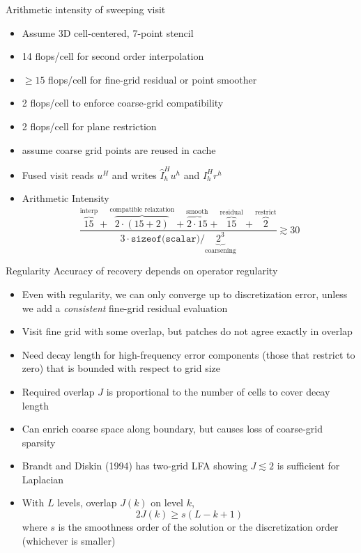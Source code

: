 \documentclass{beamer}
\begin{document}
\begin{frame}{Arithmetic intensity of sweeping visit}
  \begin{itemize}
  \item Assume 3D cell-centered, 7-point stencil
  \item 14 flops/cell for second order interpolation
  \item $\ge 15$ flops/cell for fine-grid residual or point smoother
  \item 2 flops/cell to enforce coarse-grid compatibility
  \item 2 flops/cell for plane restriction
  \item assume coarse grid points are reused in cache
  \item Fused visit reads $u^H$ and writes $\hat I_h^H u^h$ and $I_h^H r^h$
  \item Arithmetic Intensity
    \begin{equation}
      \frac{{\overbrace{15}^{\text{interp}}} + {\overbrace{2\cdot (15+2)}^{\text{compatible relaxation}}} + \overbrace{2\cdot 15}^{\text{smooth}} + \overbrace{15}^{\text{residual}} + \overbrace{2}^{\text{restrict}}}{3 \cdot \texttt{sizeof(scalar)} / \underbrace{2^3}_{\text{coarsening}}} \gtrsim 30
    \end{equation}
  \end{itemize}
\end{frame}

\begin{frame}{Regularity}
  Accuracy of recovery depends on operator regularity
  \begin{itemize}
  \item Even with regularity, we can only converge up to discretization error, unless we add a \emph{consistent} fine-grid residual evaluation
  \item Visit fine grid with some overlap, but patches do not agree exactly in overlap
  \item Need decay length for high-frequency error components (those that restrict to zero) that is bounded with respect to grid size
  \item Required overlap $J$ is proportional to the number of cells to cover decay length
  \item Can enrich coarse space along boundary, but causes loss of coarse-grid sparsity
  \item Brandt and Diskin (1994) has two-grid LFA showing $J \lesssim 2$ is sufficient for Laplacian
  \item With $L$ levels, overlap $J(k)$ on level $k$,
    \begin{equation*}
      2J(k) \ge s (L-k+1)
    \end{equation*}
    where $s$ is the smoothness order of the solution or the discretization order (whichever is smaller)
  \end{itemize}
\end{frame}



\end{document}
